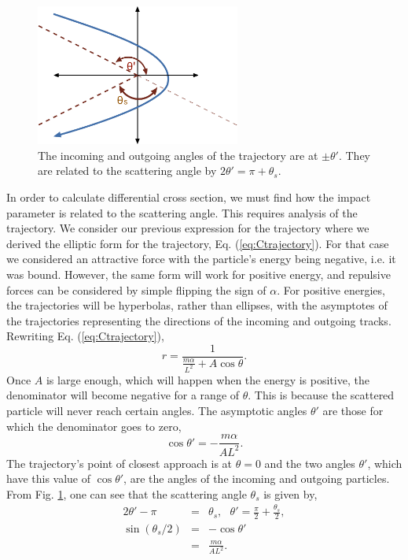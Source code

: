 \begin{figure}[!htb]
\centerline{\includegraphics[width=0.6\textwidth]{figs/rutherford}}
\caption{\label{fig:rutherford}
The incoming and outgoing angles of the trajectory are at $\pm\theta'$. They are related to the scattering angle by $2\theta'=\pi+\theta_s$.}
\end{figure}
In order to calculate differential cross section, we must find how the impact parameter is related to the scattering angle. This requires analysis of the trajectory. We consider our previous expression for the trajectory where we derived the elliptic form for the trajectory, Eq. (\ref{eq:Ctrajectory}). For that case we considered an attractive force with the particle's energy being negative, i.e. it was bound. However, the same form will work for positive energy, and repulsive forces can be considered by simple flipping the sign of $\alpha$. For positive energies, the trajectories will be hyperbolas, rather than ellipses, with the asymptotes of the trajectories representing the directions of the incoming and outgoing tracks. Rewriting Eq. (\ref{eq:Ctrajectory}),
\begin{equation}\label{eq:ruthtraj}
r=\frac{1}{\frac{m\alpha}{L^2}+A\cos\theta}.
\end{equation}
Once $A$ is large enough, which will happen when the energy is positive, the denominator will become negative for a range of $\theta$. This is because the scattered particle will never reach certain angles. The asymptotic angles $\theta'$ are those for which the denominator goes to zero,
\begin{equation}
\cos\theta'=-\frac{m\alpha}{AL^2}.
\end{equation}
The trajectory's point of closest approach is at $\theta=0$ and the two angles $\theta'$, which have this value of $\cos\theta'$, are the angles of the incoming and outgoing particles. From Fig. \ref{fig:rutherford}, one can see that the scattering angle $\theta_s$ is given by,
\begin{eqnarray}
\label{eq:sthetover2}
2\theta'-\pi&=&\theta_s,~~~\theta'=\frac{\pi}{2}+\frac{\theta_s}{2},\\
\nonumber
\sin(\theta_s/2)&=&-\cos\theta'\\
\nonumber
&=&\frac{m\alpha}{AL^2}.
\end{eqnarray}
